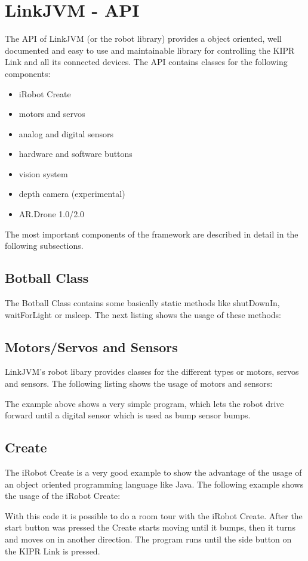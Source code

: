 \documentclass{juniorjournal}
\begin{document}
\section{LinkJVM - API}
The API of LinkJVM (or the robot library) provides a object oriented, well documented and easy to use and maintainable library for controlling the KIPR\cite{KIPR} Link\cite{link}
 and all its connected devices.
The API contains classes for the following components:
\begin{itemize}
	\item iRobot Create\cite{create}
	\item motors and servos
	\item analog and digital sensors
	\item hardware and software buttons
	\item vision system
	\item depth camera (experimental)
	\item AR.Drone 1.0/2.0\cite{ar.drone}
\end{itemize}
The most important components of the framework are described in detail in the following subsections.

\subsection{Botball Class}
The Botball Class contains some basically static methods like shutDownIn,
waitForLight or msleep.
The next listing shows the usage of these methods:


\subsection{Motors/Servos and Sensors}
LinkJVM's robot libary provides classes for the different types or motors, servos and sensors.
The following listing shows the usage of motors and sensors:

The example above shows a very simple program, which lets the robot drive forward
until a digital sensor which is used as bump sensor bumps.

\subsection{Create}
The iRobot Create\cite{create} is a very good example to show the advantage of the usage of
an object oriented programming language like Java\cite{Java}.
The following example shows the usage of the iRobot Create\cite{create}:

With this code it is possible to do a room tour with the iRobot Create\cite{create}.
After the start button was pressed the Create\cite{create} starts moving until it bumps, then
it turns and moves on in another direction. The program runs until the side
button on the KIPR\cite{KIPR} Link\cite{link} is pressed.
\end{document}
